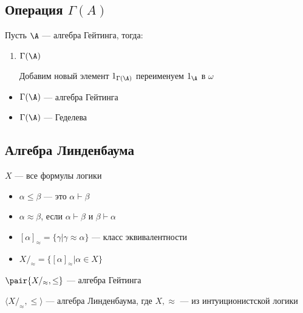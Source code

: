 \documentclass[english]{article}
\begin{document}
\subsection{Операция \(\Gamma(A)\)}
\label{sec:org93faad6}
\begin{definition}
	Пусть \(\A\) --- алгебра Гейтинга, тогда:
	\begin{enumerate}
		\item \(\Gamma(\A)\) \\
		      \begin{center}
		      \end{center}

		      Добавим новый элемент \(1_{\Gamma(\A)}\) переименуем \(1_\A\) в  \(\omega\)
	\end{enumerate}
	\label{orgc5bc136}
\end{definition}
\begin{theorem}
	\-
	\begin{itemize}
		\item \(\Gamma(\A)\) --- алгебра Гейтинга
		\item \(\Gamma(\A)\) --- Геделева
	\end{itemize}
	\label{orgf9f585b}
\end{theorem}
\subsection{Алгебра Линденбаума}
\label{sec:org7bda8f6}
\begin{definition}
	\(X\) --- все формулы логики
	\begin{itemize}
		\item \(\alpha \le \beta\) --- это \(\alpha \vdash \beta\)
		\item \(\alpha \approx \beta\), если \(\alpha \vdash \beta\) и \(\beta \vdash \alpha\)
		\item \([\alpha]_\approx = \{\gamma \big| \gamma \approx \alpha\}\) --- класс эквивалентности
		\item \(X/_\approx = \{[\alpha]_\approx \big| \alpha \in X\}\)
	\end{itemize}
	\(\pair{X/_\approx, \le}\) --- алгебра Гейтинга
	\label{org2400208}
\end{definition}
\begin{property}
	\(\langle X/_\approx, \le \rangle\) --- алгебра Линденбаума, где \(X, \approx\) --- из интуиционистской логики
	\label{orgf09abb3}
\end{property}
\end{document}
